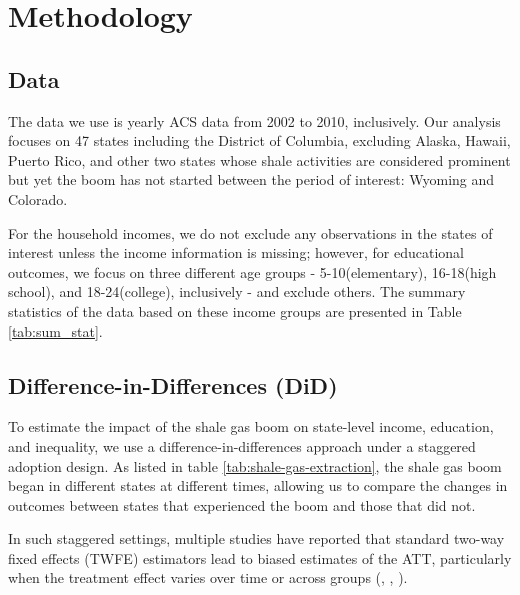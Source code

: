 \section{Methodology}
\label{sec:methodology}


\subsection{Data}
\label{subsec:data}
The data we use is yearly ACS data from 2002 to 2010, inclusively.
Our analysis focuses on 47 states including the District of Columbia, excluding Alaska, Hawaii, Puerto Rico, and other two states
whose shale activities are considered prominent but yet the boom has not started between 
the period of interest: Wyoming and Colorado.

For the household incomes, we do not exclude any observations in the states of interest unless the income information is missing;
however, for educational outcomes, we focus on three different age groups -  5-10(elementary), 16-18(high school), and 18-24(college), inclusively - and exclude others.
The summary statistics of the data based on these income groups are presented in Table \ref{tab:sum_stat}.




\subsection{Difference-in-Differences (DiD)}
\label{subsec:did}

To estimate the impact of the shale gas boom on state-level income, education, and inequality, we use a difference-in-differences approach under a staggered adoption design.
As listed in table \ref{tab:shale-gas-extraction}, the shale gas boom began in different states at different times, 
allowing us to compare the changes in outcomes between states that experienced the boom and those that did not.

In such staggered settings, multiple studies have reported that standard two-way fixed effects (TWFE) estimators lead to biased estimates of the ATT, 
particularly when the treatment effect varies over time or across groups (\cite{de2020two}, \cite{goodman2021difference}, \cite{roth2023s}).

